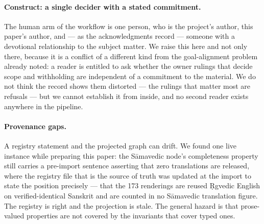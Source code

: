 \paragraph{Construct: a single decider with a stated commitment.} The human arm of
the workflow is one person, who is the project's author, this paper's author, and
--- as the acknowledgments record --- someone with a devotional relationship to the
subject matter. We raise this here and not only there, because it is a conflict of
a different kind from the goal-alignment problem already noted: a reader is
entitled to ask whether the owner rulings that decide scope and withholding are
independent of a commitment to the material. We do not think the record shows them
distorted --- the rulings that matter most are refusals --- but we cannot establish
it from inside, and no second reader exists anywhere in the pipeline.

\paragraph{Provenance gaps.} A registry statement and the projected graph can drift.
We found one live instance while preparing this paper: the S\=amavedic
 node's completeness property still carries a pre-import sentence
asserting that zero translations are released, where the registry file that is the
source of truth was updated at the import to state the position precisely --- that
the 173 renderings are reused \d{R}gvedic English on verified-identical Sanskrit and
are counted in no S\=amavedic translation figure. The registry is right and the
projection is stale. The general hazard is that prose-valued properties are not
covered by the invariants that cover typed ones.
